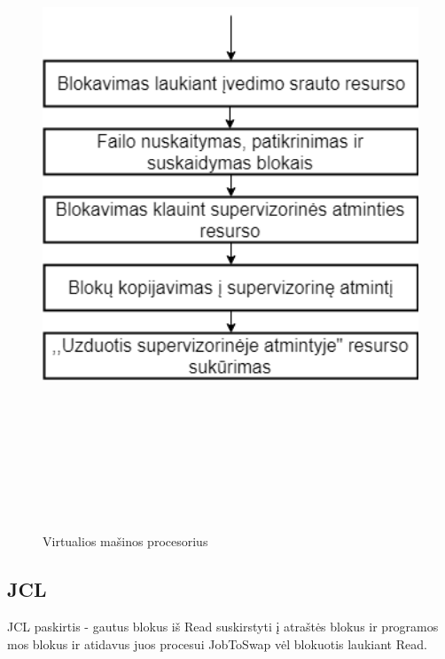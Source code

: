 \documentclass[oneside]{VUMIFPSkursinis}
\begin{document}
\begin{figure}[H]
		\centering	
	\includegraphics[width=18cm,height=20cm,keepaspectratio]{Read.png}
	\caption{Virtualios mašinos procesorius}
	\label{fig:Virtualios mašinos procesorius}
\end{figure} 

\subsection{JCL} JCL paskirtis - gautus blokus iš Read suskirstyti į atraštės blokus ir programos mos blokus ir atidavus juos procesui JobToSwap vėl blokuotis laukiant Read.
\end{document}

